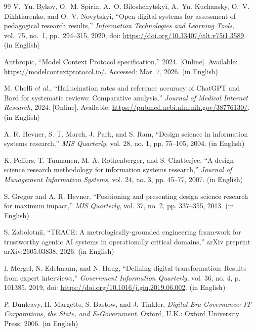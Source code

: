 \begin{thebibliography}{99}
V.~Yu. Bykov, O.~M. Spirin, A.~O. Biloshchytskyi, A.~Yu. Kuchansky, O.~V. Dikhtiarenko, and O.~V. Novytskyi, ``Open digital systems for assessment of pedagogical research results,'' \emph{Information Technologies and Learning Tools}, vol.~75, no.~1, pp.~294--315, 2020, doi: \url{https://doi.org/10.33407/itlt.v75i1.3589}. (in English)

Anthropic, ``Model Context Protocol specification,'' 2024. [Online]. Available: \url{https://modelcontextprotocol.io/}. Accessed: Mar. 7, 2026. (in English)

M. Chelli \emph{et al.}, ``Hallucination rates and reference accuracy of ChatGPT and Bard for systematic reviews: Comparative analysis,'' \emph{Journal of Medical Internet Research}, 2024. [Online]. Available: \url{https://pubmed.ncbi.nlm.nih.gov/38776130/}. (in English)

A. R. Hevner, S. T. March, J. Park, and S. Ram, ``Design science in information systems research,'' \emph{MIS Quarterly}, vol. 28, no. 1, pp. 75--105, 2004. (in English)

K. Peffers, T. Tuunanen, M. A. Rothenberger, and S. Chatterjee, ``A design science research methodology for information systems research,'' \emph{Journal of Management Information Systems}, vol. 24, no. 3, pp. 45--77, 2007. (in English)

S. Gregor and A. R. Hevner, ``Positioning and presenting design science research for maximum impact,'' \emph{MIS Quarterly}, vol. 37, no. 2, pp. 337--355, 2013. (in English)

S. Zabolotnii, ``TRACE: A metrologically-grounded engineering framework for trustworthy agentic AI systems in operationally critical domains,'' arXiv preprint arXiv:2605.03838, 2026. (in English)

I. Mergel, N. Edelmann, and N. Haug, ``Defining digital transformation: Results from expert interviews,'' \emph{Government Information Quarterly}, vol. 36, no. 4, p. 101385, 2019, doi: \url{https://doi.org/10.1016/j.giq.2019.06.002}. (in English)

P. Dunleavy, H. Margetts, S. Bastow, and J. Tinkler, \emph{Digital Era Governance: IT Corporations, the State, and E-Government}. Oxford, U.K.: Oxford University Press, 2006. (in English)


\end{thebibliography}
